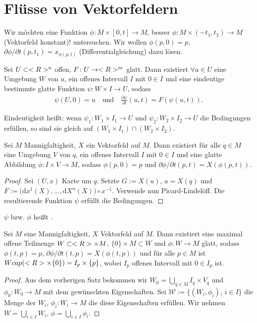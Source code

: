 \section{Flüsse von Vektorfeldern}
Wir möchten eine Funktion $\phi\colon M\times[0,t]\to M$, besser $\phi\colon M\times (-t_1,t_2)\to M$ (Vektorfeld konstant)! untersuchen. Wir wollen $\phi(p,0) = p$, $\partial\phi\slash\partial t(p,t_1) = x_{\phi(p,t)}$ (Differentialgleichung) dazu lösen.

\begin{repetition}
	Sei $U\subset<R>^n$ offen, $F\colon U\to <R>^m$ glatt. Dann existiert $\forall a\in U$ eine Umgebung $W$ von $a$, ein offenes Intervall $I$ mit $0\in I$ und eine eindeutige bestimmte glatte Funktion $\psi\colon W\times I\to U$, sodass \begin{align*}
		\psi(U,0) = u\quad\text{und}\quad\frac{\partial\psi}{\partial t}(u,t) = F(\psi(u,t)).
	\end{align*}
	
	Eindeutigkeit heißt: wenn $\psi_1\colon W_1\times I_1\to U$ und $\psi_2\colon W_2\times I_2\to U$ die Bedingungen erfüllen, so sind sie gleich auf $(W_1\times I_1)\cap (W_2\times I_2)$.
\end{repetition}

\begin{conclusion}
	Sei $M$ Mannigfaltigkeit, $X$ ein Vektorfeld auf $M$. Dann existiert für alle $q\in M$ eine Umgebung $V$ von $q$, ein offenes Intervall $I$ mit $0\in I$ und eine glatte Abbildung $\phi\colon I\times V\to M$, sodass $\phi(p,0) = p$ und $\partial\phi\slash\partial t(p,t) = X(\phi(p,t))$.
\end{conclusion}
\begin{proof}
	Sei $(U,x)$ Karte um $q$. Setzte $ G:= X(u)$, $a = X(q)$ und $F:=\big(\mathrm dx^1(X),\dots,\mathrm d X^n(X)\big)\circ x^{-1}$. Verwende nun Picard-Lindelöff. Die resultierende Funktion $\psi$ erfüllt die Bedingungen.
\end{proof}

\begin{remark}
	$\psi$ bzw. $\phi$ heißt .
\end{remark}

\begin{proposition}
	Sei $M$ eine Mannigfaltigkeit, $X$ Vektorfeld auf $M$. Dann existiert eine maximal offene Teilmenge $W\subset <R>\times M$, $\{0\}\times M\subset W$ und $\phi\colon W\to M$ glatt, sodass $\phi(t,p) = p$, $\partial \phi\slash\partial t(t,p) = X(\phi(t,p))$ und für alle $p\in M$ ist $Wcap(<R>\times \{0\})= I_p\times \{p\}$, wobei $I_p$ offenes Intervall mit $0\in I_p$ ist.
\end{proposition}
\begin{proof}
	Aus dem vorherigen Satz bekommen wir $W_0 = \bigcup_ {q\in M} I_q\times V_q$ und $\phi_0\colon W_0\to M$ mit dem gewünschten Eigenschaften.
	Sei $\mathcal W := \{(W_i,\phi_i),\,i\in I\}$ die Menge der $W_i$, $\phi_i\colon W_i\to M$ die diese Eigenschaften erfüllen. Wir nehmen $W = \bigcup_{i\in I} W_i$, $\phi = \bigcup_{i\in I}\phi_i$.
\end{proof}


